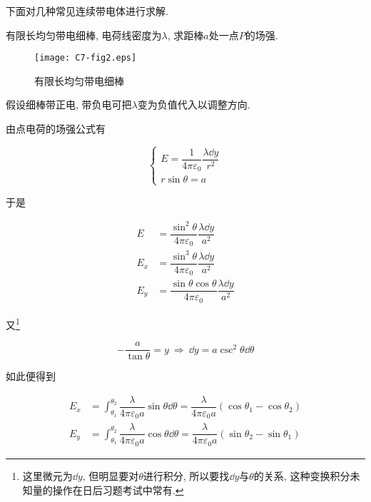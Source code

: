 下面对几种常见连续带电体进行求解. 

\vskip 0.3cm

\begin{example}
	有限长均匀带电细棒, 电荷线密度为$\lambda$, 求距棒$a$处一点$P$的场强.
	
	\begin{figure}[H]
		\centering
		\texttt{[image: C7-fig2.eps]}
		\caption{有限长均匀带电细棒}
		\label{C7-fig2}
	\end{figure}
	
	\begin{solution}
		假设细棒带正电, 带负电可把$\lambda$变为负值代入以调整方向. 
		
		由点电荷的场强公式有
		
		\begin{equation*}
			\begin{cases}
				E = \dfrac{1}{4\pi \varepsilon_0} \dfrac{\lambda \dd{y}}{r^2} \\
				r \sin \theta = a 
			\end{cases}
		\end{equation*}
		
		于是
		
		\begin{align*}
			E &= \dfrac{\sin^2 \theta}{4\pi \varepsilon_0} \dfrac{\lambda \dd{y}}{a^2} \\
			E_x &= \dfrac{\sin^3 \theta}{4\pi \varepsilon_0} \dfrac{\lambda \dd{y}}{a^2} \\
			E_y &= \dfrac{\sin \theta \cos \theta}{4\pi \varepsilon_0} \dfrac{\lambda \dd{y}}{a^2} 
		\end{align*}
		
		又\footnote{这里微元为$\dd{y}$, 但明显要对$\theta$进行积分, 所以要找$\dd{y}$与$\theta$的关系, 这种变换积分未知量的操作在日后习题考试中常有. }
		
		\begin{equation*}
			- \dfrac{a}{\tan \theta} = y ~\Rightarrow~ \dd{y} = a \csc^2 \theta \dd{\theta}
		\end{equation*}
		
		如此便得到
		
		\begin{align*}
			E_x &= \int_{\theta_1}^{\theta_2} \dfrac{\lambda}{4 \pi \varepsilon_0 a} \sin \theta \dd{\theta} = \dfrac{\lambda}{4 \pi \varepsilon_0 a} (\cos \theta_1 - \cos \theta_2) \\
			E_y &= \int_{\theta_1}^{\theta_2} \dfrac{\lambda}{4 \pi \varepsilon_0 a} \cos \theta \dd{\theta} = \dfrac{\lambda}{4 \pi \varepsilon_0 a} (\sin \theta_2 - \sin \theta_1)
		\end{align*}
		
	\end{solution}
	 
\end{example}

